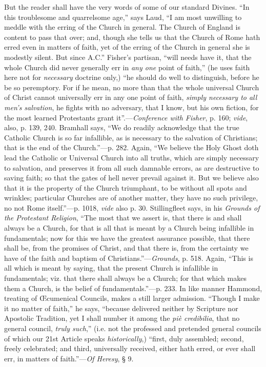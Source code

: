 But the
reader shall have the very words of some of our standard Divines. ``In
this troublesome and quarrelsome age,'' says Laud, ``I am most
unwilling to meddle with the erring of the Church in general. The Church
of England is content to pass that over; and, though she tells us that
the Church of Rome hath erred even in matters of faith, yet of the
erring of the Church in general she is modestly silent. But since A.C.''
Fisher's partisan, ``will needs have it, that the whole Church did
never generally err in \emph{any one} point of faith,'' (he uses faith
here not for \emph{necessary} doctrine only,) ``he should do well to
distinguish, before he be so peremptory. For if he mean, no more than
that the whole universal Church of Christ cannot universally err in any
one point of faith, \emph{simply necessary to all men's salvation}, he
fights with no adversary, that I know, but his own fiction, for the most
learned Protestants grant it''.—\emph{Conference with Fisher}, p.
160; \emph{vide}, also, p. 139, 240. Bramhall says, ``We do readily
acknowledge that the true Catholic Church is so far infallible, as is
necessary to the salvation of Christians; that is the end of the
Church.''—p. 282. Again, ``We believe the Holy Ghost doth lead the
Catholic or Universal Church into all truths, which are simply necessary
to salvation, and
preserves it from all such damnable errors, as are destructive to saving
faith; so that the gates of hell never prevail against it. But we
believe also that it is the property of the Church triumphant, to be
without all spots and wrinkles; particular Churches are of another
matter, they have no such privilege, no not Rome itself.''—p. 1018, \emph{vide}
also p. 30. Stillingfleet says, in his \emph{Grounds of the Protestant
Religion}, ``The most that we assert is, that there is and shall
always be a Church, for that is all that is meant by a Church being
infallible in fundamentals; now for this we have the greatest assurance
possible, that there shall be, from the promises of Christ, and that
there is, from the certainty we have of the faith and baptism of
Christians.''—\emph{Grounds}, p. 518. Again, ``This is all which is
meant by saying, that the present Church is infallible in fundamentals;
viz. that there shall always be a Church; for that which makes them a
Church, is the belief of fundamentals.''—p. 233. In like manner
Hammond, treating of Œcumenical Councils, makes a still larger
admission. ``Though I make it no matter of faith,'' he says, ``because delivered neither by Scripture nor Apostolic Tradition, yet I
shall number it among the \emph{piè credibilia}, that no general
council, \emph{truly such},'' (i.e. not the professed and pretended
general councils of which our 21st Article speaks \emph{historically},) ``first, duly assembled; second, freely celebrated; and third,
universally received, either hath erred, or ever shall err, in matters
of faith.''—\emph{Of Heresy}, § 9.

